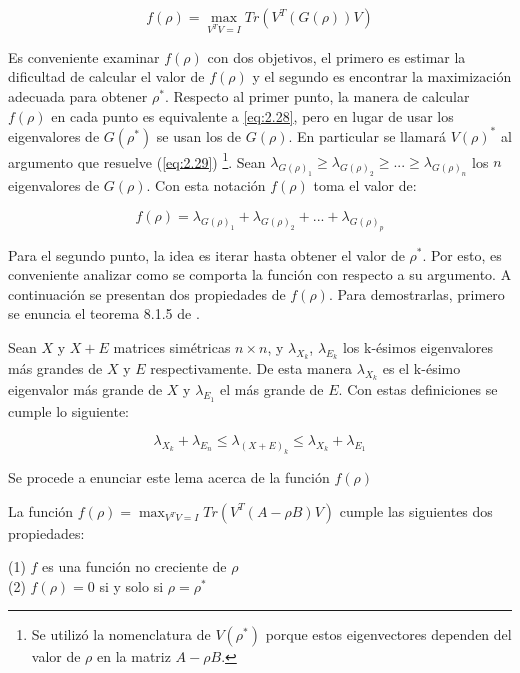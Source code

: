 \begin{equation}  \label{eq:2.29}
	f(\rho) = \max_{V^T V = I} Tr(V^T (G(\rho)) V)
\end{equation}

Es conveniente examinar $f(\rho)$ con dos objetivos, el primero es estimar la dificultad de calcular el valor de $f(\rho)$ y el segundo es encontrar la maximización adecuada para obtener $\rho^*$. Respecto al primer punto, la manera de calcular $f(\rho)$ en cada punto es equivalente a \ref{eq:2.28}, pero en lugar de usar los eigenvalores de $G(\rho^*)$ se usan los de $G(\rho)$. En particular se llamará $V(\rho)^*$ al argumento que resuelve (\ref{eq:2.29}) \footnote{Se utilizó la nomenclatura de $V(\rho^*)$ porque estos eigenvectores dependen del valor de $\rho$ en la matriz $A - \rho B$.}. Sean $\lambda_{G(\rho)_1} \geq \lambda_{G(\rho)_2} \geq ... \geq \lambda_{G(\rho)_n}$ los $n$ eigenvalores de $G(\rho)$. Con esta notación $f(\rho)$ toma el valor de:


\begin{equation}\label{eq:2.30}
f(\rho) = \lambda_{G(\rho)_1} + \lambda_{G(\rho)_2} + ... +\lambda_{G(\rho)_p}
\end{equation}


Para el segundo punto, la idea es iterar hasta obtener el valor de $\rho^*$. Por esto, es conveniente analizar como se comporta la función con respecto a su argumento. A continuación se presentan dos propiedades de $f(\rho)$. Para demostrarlas, primero se enuncia el teorema 8.1.5 de \cite{golub2012matrix}.

\begin{theorem} \label{teorem.1}
	
	Sean $X$ y $X+E$ matrices simétricas $n \times n$, y $\lambda_{X_k}$, $\lambda_{E_k}$ los k-ésimos eigenvalores más grandes de $X$ y $E$ respectivamente. De esta manera $\lambda_{X_k}$ es el k-ésimo eigenvalor más grande de $X$ y $\lambda_{E_1}$ el más grande de $E$. Con estas definiciones se cumple lo siguiente:

	\begin{equation}\label{eq:2.31}
		\lambda_{X_k} +\lambda_{E_n} \leq \lambda_{(X+E)_k} \leq \lambda_{X_k} +\lambda_{E_1}
	\end{equation}

\end{theorem}

Se procede a enunciar este lema acerca de la función $f(\rho)$

\begin{lemma}\label{lemma2.6}
La función $f(\rho) = \max_{V^T V = I} Tr(V^T (A - \rho B) V)$ cumple las siguientes dos propiedades: 

(1) $f$ es una función no creciente de $\rho$ \\
(2) $f(\rho)= 0$  si y solo si $\rho = \rho^*$
\end{lemma}

